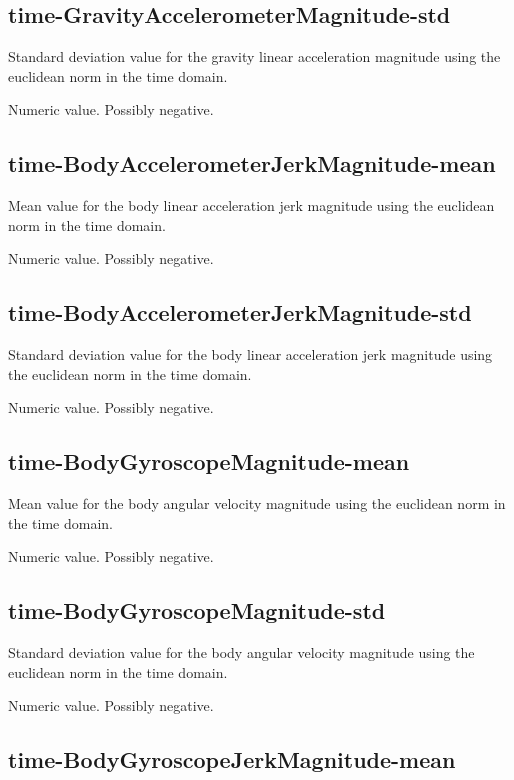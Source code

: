 \documentclass[a4paper,10pt]{report}
\begin{document}
\subsection*{time-GravityAccelerometerMagnitude-std} 

Standard deviation value for the gravity linear acceleration magnitude using the euclidean norm in the time domain.

Numeric value. Possibly negative.

\subsection*{time-BodyAccelerometerJerkMagnitude-mean} 

Mean value for the body linear acceleration jerk magnitude using the euclidean norm in the time domain.

Numeric value. Possibly negative.

\subsection*{time-BodyAccelerometerJerkMagnitude-std} 

Standard deviation value for the body linear acceleration jerk magnitude using the euclidean norm in the time domain.

Numeric value. Possibly negative.

\subsection*{time-BodyGyroscopeMagnitude-mean} 

Mean value for the body angular velocity magnitude using the euclidean norm in the time domain.

Numeric value. Possibly negative.

\subsection*{time-BodyGyroscopeMagnitude-std} 

Standard deviation value for the body angular velocity magnitude using the euclidean norm in the time domain.

Numeric value. Possibly negative.

\subsection*{time-BodyGyroscopeJerkMagnitude-mean} 
\end{document}
